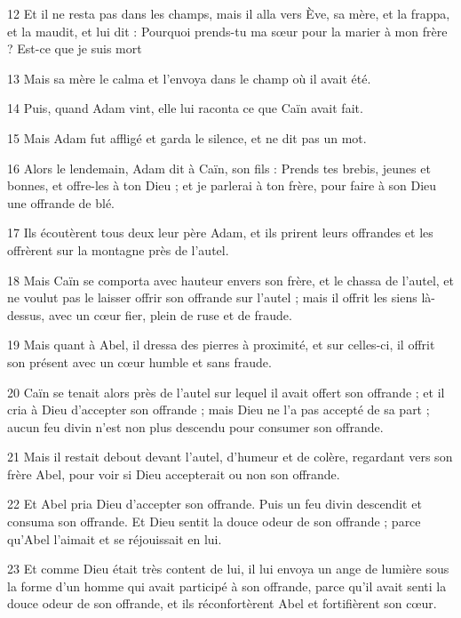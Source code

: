 \par 12 Et il ne resta pas dans les champs, mais il alla vers Ève, sa mère, et la frappa, et la maudit, et lui dit : Pourquoi prends-tu ma sœur pour la marier à mon frère ? Est-ce que je suis mort

\par 13 Mais sa mère le calma et l'envoya dans le champ où il avait été.

\par 14 Puis, quand Adam vint, elle lui raconta ce que Caïn avait fait.

\par 15 Mais Adam fut affligé et garda le silence, et ne dit pas un mot.

\par 16 Alors le lendemain, Adam dit à Caïn, son fils : Prends tes brebis, jeunes et bonnes, et offre-les à ton Dieu ; et je parlerai à ton frère, pour faire à son Dieu une offrande de blé.

\par 17 Ils écoutèrent tous deux leur père Adam, et ils prirent leurs offrandes et les offrèrent sur la montagne près de l'autel.

\par 18 Mais Caïn se comporta avec hauteur envers son frère, et le chassa de l'autel, et ne voulut pas le laisser offrir son offrande sur l'autel ; mais il offrit les siens là-dessus, avec un cœur fier, plein de ruse et de fraude.

\par 19 Mais quant à Abel, il dressa des pierres à proximité, et sur celles-ci, il offrit son présent avec un cœur humble et sans fraude.

\par 20 Caïn se tenait alors près de l'autel sur lequel il avait offert son offrande ; et il cria à Dieu d'accepter son offrande ; mais Dieu ne l'a pas accepté de sa part ; aucun feu divin n’est non plus descendu pour consumer son offrande.

\par 21 Mais il restait debout devant l'autel, d'humeur et de colère, regardant vers son frère Abel, pour voir si Dieu accepterait ou non son offrande.

\par 22 Et Abel pria Dieu d'accepter son offrande. Puis un feu divin descendit et consuma son offrande. Et Dieu sentit la douce odeur de son offrande ; parce qu'Abel l'aimait et se réjouissait en lui.

\par 23 Et comme Dieu était très content de lui, il lui envoya un ange de lumière sous la forme d'un homme qui avait participé à son offrande, parce qu'il avait senti la douce odeur de son offrande, et ils réconfortèrent Abel et fortifièrent son cœur.

